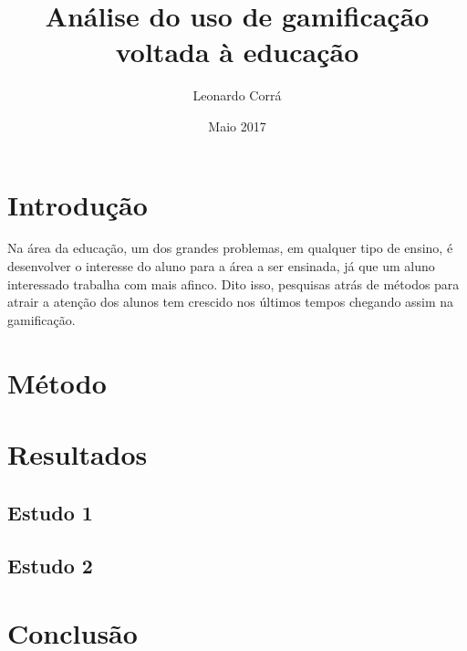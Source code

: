 \documentclass{article}
\title{Análise do uso de gamificação voltada à educação}
\author{Leonardo Corrá}
\date{Maio 2017}
\begin{document}
\maketitle

	
	


\section{Introdução}
\large Na área da educação, um dos grandes problemas, em qualquer tipo de ensino, é desenvolver o interesse do aluno para a área a ser ensinada, já que um aluno interessado trabalha com mais afinco. Dito isso, pesquisas atrás de métodos para atrair a atenção dos alunos tem crescido nos últimos tempos chegando assim na gamificação.

\section{Método}

\section{Resultados}

\subsection{Estudo 1}

\subsection{Estudo 2}

\section{Conclusão}

\cite{cardoso:2014}
\cite{seaborn:2014}
\cite{dixon:2011}
\cite{huang:2013}
\cite{isotani:2014}
\cite{oliveira:2016}
\cite{ibanez:2014}
\cite{morrison:2014}
\cite{hamari:2014}


\end{document}
